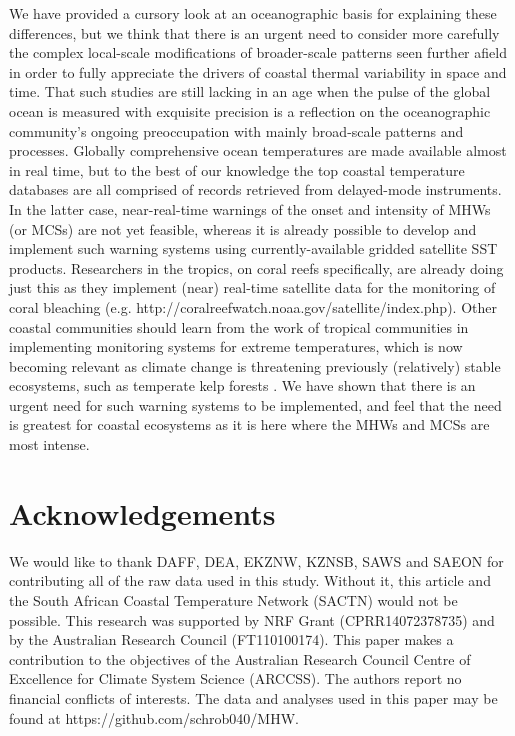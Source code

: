 \documentclass[a4paper,10pt,review]{elsarticle}
\begin{document}
We have provided a cursory look at an oceanographic basis for explaining these differences, but we think that there is an urgent need to consider more carefully the complex local-scale modifications of broader-scale patterns seen further afield in order to fully appreciate the drivers of coastal thermal variability in space and time. That such studies are still lacking in an age when the pulse of the global ocean is measured with exquisite precision is a reflection on the oceanographic community's ongoing preoccupation with mainly broad-scale patterns and processes. Globally comprehensive ocean temperatures are made available almost in real time, but to the best of our knowledge the top coastal temperature databases are all comprised of records retrieved from delayed-mode instruments. In the latter case, near-real-time warnings of the onset and intensity of MHWs (or MCSs) are not yet feasible, whereas it is already possible to develop and implement such warning systems using currently-available gridded satellite SST products. Researchers in the tropics, on coral reefs specifically, are already doing just this as they implement (near) real-time satellite data for the monitoring of coral bleaching (e.g. http://coralreefwatch.noaa.gov/satellite/index.php). Other coastal communities should learn from the work of tropical communities in implementing monitoring systems for extreme temperatures, which is now becoming relevant as climate change is threatening previously (relatively) stable ecosystems, such as temperate kelp forests \citep{Wernberg2013}. We have shown that there is an urgent need for such warning systems to be implemented, and feel that the need is greatest for coastal ecosystems as it is here where the MHWs and MCSs are most intense.

\section*{Acknowledgements}
We would like to thank DAFF, DEA, EKZNW, KZNSB, SAWS and SAEON for contributing all of the raw data used in this study. Without it, this article and the South African Coastal Temperature Network (SACTN) would not be possible. This research was supported by NRF Grant (CPRR14072378735) and by the Australian Research Council (FT110100174). This paper makes a contribution to the objectives of the Australian Research Council Centre of Excellence for Climate System Science (ARCCSS). The authors report no financial conflicts of interests. The data and analyses used in this paper may be found at https://github.com/schrob040/MHW.
\end{document}
